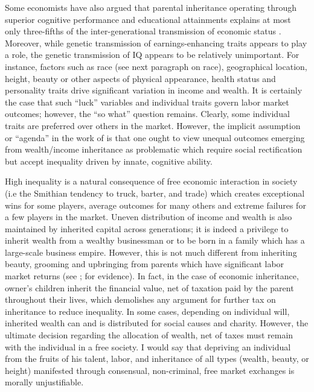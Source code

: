 \documentclass[12pt]{article}
\newcommand{\1}{\mathbbm 1}
\begin{document}
	    Some economists have also argued that parental inheritance operating through superior cognitive performance and educational attainments explains at most only three-fifths of the inter-generational transmission of economic status \cite{bowles2002inheritance}. Moreover, while genetic transmission of earnings-enhancing traits appears to play a role, the genetic transmission of IQ appears to be relatively unimportant. For instance, factors such as race (see next paragraph on race), geographical location, height, beauty or other aspects of physical appearance, health status and personality traits drive significant variation in income and wealth. It is certainly the case that such ``luck'' variables and individual traits govern labor market outcomes; however, the ``so what'' question remains. Clearly, some individual traits are preferred over others in the market. However, the implicit assumption or ``agenda'' in the work of \cite{bowles2002inheritance} is that one ought to view unequal outcomes emerging from wealth/income inheritance as problematic which require social rectification but accept inequality driven by innate, cognitive ability. 
	    
	    
	    
	    High inequality is a natural consequence of free economic interaction in society (i.e the Smithian tendency to truck, barter, and trade) which creates exceptional wins for some players, average outcomes for many others and extreme failures for a few players in the market. Uneven distribution of income and wealth is also maintained by inherited capital across generations; it is indeed a privilege to inherit wealth from a wealthy businessman or to be born in a family which has a large-scale business empire. However, this is not much different from inheriting beauty, grooming and upbringing from parents which have significant labor market returns (see \cite{mobius2006beauty}; \cite{robins2011beauty} for evidence). In fact, in the case of economic inheritance, owner's children inherit the financial value, net of taxation paid by the parent throughout their lives, which demolishes any argument for further tax on inheritance to reduce inequality. In some cases, depending on individual will, inherited wealth can and is distributed for social causes and charity. However, the ultimate decision regarding the allocation of wealth, net of taxes must remain with the individual in a free society. I would say that depriving an individual from the fruits of his talent, labor, and inheritance of all types (wealth, beauty, or height) manifested through consensual, non-criminal, free market exchanges is morally unjustifiable. 
	    
\end{document}
